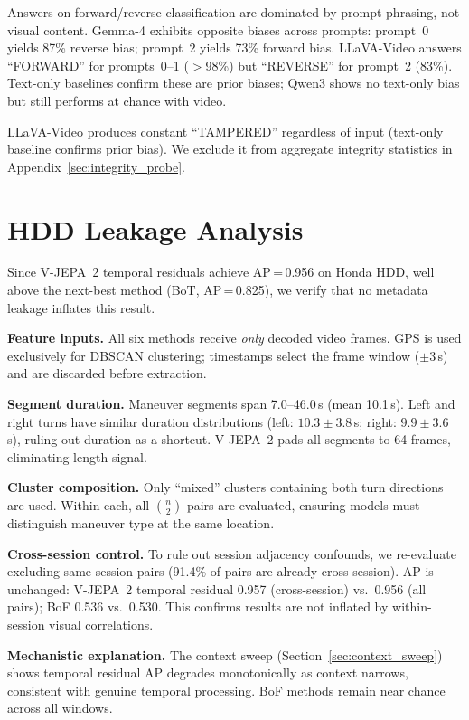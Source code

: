 \documentclass{article}
\theoremstyle{remark}
\begin{document}
Answers on forward/reverse classification are dominated by prompt phrasing, not visual content. Gemma-4 exhibits opposite biases across prompts: prompt~0 yields 87\% reverse bias; prompt~2 yields 73\% forward bias. LLaVA-Video answers ``FORWARD'' for prompts~0--1 ($>$98\%) but ``REVERSE'' for prompt~2 (83\%). Text-only baselines confirm these are prior biases; Qwen3 shows no text-only bias but still performs at chance with video.

LLaVA-Video produces constant ``TAMPERED'' regardless of input (text-only baseline confirms prior bias). We exclude it from aggregate integrity statistics in Appendix~\ref{sec:integrity_probe}.

\section{HDD Leakage Analysis}
\label{sec:hdd_leakage}

Since V-JEPA~2 temporal residuals achieve AP\,=\,0.956 on Honda HDD, well above the next-best method (BoT, AP\,=\,0.825), we verify that no metadata leakage inflates this result.

\textbf{Feature inputs.} All six methods receive \emph{only} decoded video frames. GPS is used exclusively for DBSCAN clustering; timestamps select the frame window ($\pm$3\,s) and are discarded before extraction.

\textbf{Segment duration.} Maneuver segments span 7.0--46.0\,s (mean 10.1\,s). Left and right turns have similar duration distributions (left: $10.3 \pm 3.8$\,s; right: $9.9 \pm 3.6$\,s), ruling out duration as a shortcut. V-JEPA~2 pads all segments to 64 frames, eliminating length signal.

\textbf{Cluster composition.} Only ``mixed'' clusters containing both turn directions are used. Within each, all $\binom{n}{2}$ pairs are evaluated, ensuring models must distinguish maneuver type at the same location.

\textbf{Cross-session control.} To rule out session adjacency confounds, we re-evaluate excluding same-session pairs (91.4\% of pairs are already cross-session). AP is unchanged: V-JEPA~2 temporal residual 0.957 (cross-session) vs.\ 0.956 (all pairs); BoF 0.536 vs.\ 0.530. This confirms results are not inflated by within-session visual correlations.

\textbf{Mechanistic explanation.} The context sweep (Section~\ref{sec:context_sweep}) shows temporal residual AP degrades monotonically as context narrows, consistent with genuine temporal processing. BoF methods remain near chance across all windows.
\end{document}
